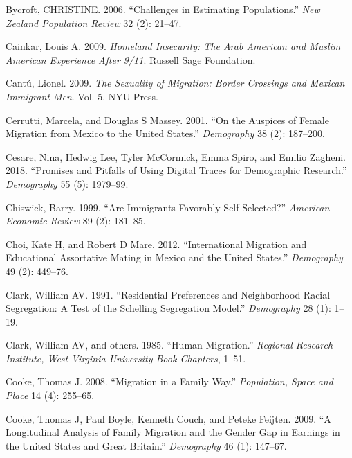 \documentclass[
]{article}
\begin{document}
\leavevmode\hypertarget{ref-bycroft2006challenges}{}%
Bycroft, CHRISTINE. 2006. ``Challenges in Estimating Populations.''
\emph{New Zealand Population Review} 32 (2): 21--47.

\leavevmode\hypertarget{ref-cainkar2009homeland}{}%
Cainkar, Louis A. 2009. \emph{Homeland Insecurity: The Arab American and
Muslim American Experience After 9/11}. Russell Sage Foundation.

\leavevmode\hypertarget{ref-cantu2009sexuality}{}%
Cantú, Lionel. 2009. \emph{The Sexuality of Migration: Border Crossings
and Mexican Immigrant Men}. Vol. 5. NYU Press.

\leavevmode\hypertarget{ref-cerrutti2001auspices}{}%
Cerrutti, Marcela, and Douglas S Massey. 2001. ``On the Auspices of
Female Migration from Mexico to the United States.'' \emph{Demography}
38 (2): 187--200.

\leavevmode\hypertarget{ref-cesare2018promises}{}%
Cesare, Nina, Hedwig Lee, Tyler McCormick, Emma Spiro, and Emilio
Zagheni. 2018. ``Promises and Pitfalls of Using Digital Traces for
Demographic Research.'' \emph{Demography} 55 (5): 1979--99.

\leavevmode\hypertarget{ref-chiswick1999immigrants}{}%
Chiswick, Barry. 1999. ``Are Immigrants Favorably Self-Selected?''
\emph{American Economic Review} 89 (2): 181--85.

\leavevmode\hypertarget{ref-choi2012international}{}%
Choi, Kate H, and Robert D Mare. 2012. ``International Migration and
Educational Assortative Mating in Mexico and the United States.''
\emph{Demography} 49 (2): 449--76.

\leavevmode\hypertarget{ref-clark1991residential}{}%
Clark, William AV. 1991. ``Residential Preferences and Neighborhood
Racial Segregation: A Test of the Schelling Segregation Model.''
\emph{Demography} 28 (1): 1--19.

\leavevmode\hypertarget{ref-clark1985human}{}%
Clark, William AV, and others. 1985. ``Human Migration.'' \emph{Regional
Research Institute, West Virginia University Book Chapters}, 1--51.

\leavevmode\hypertarget{ref-cooke2008migration}{}%
Cooke, Thomas J. 2008. ``Migration in a Family Way.'' \emph{Population,
Space and Place} 14 (4): 255--65.

\leavevmode\hypertarget{ref-cooke2009longitudinal}{}%
Cooke, Thomas J, Paul Boyle, Kenneth Couch, and Peteke Feijten. 2009.
``A Longitudinal Analysis of Family Migration and the Gender Gap in
Earnings in the United States and Great Britain.'' \emph{Demography} 46
(1): 147--67.
\end{document}

